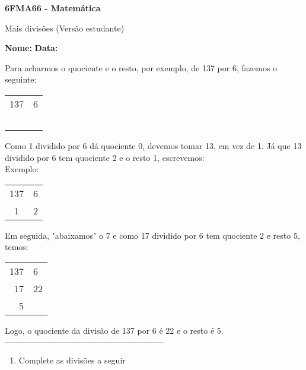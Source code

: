\documentclass[a4paper,14pt]{article}
\begin{document}
	
	\noindent\textbf{6FMA66 - Matemática} 
	
	\begin{center}Mais divisões (Versão estudante)
	\end{center}
	
	\noindent\textbf{Nome:} \underline{\hspace{10cm}}
	\noindent\textbf{Data:} \underline{\hspace{4cm}}
	
	\begin{multicols}{2}
		\noindent Para acharmos o quociente e o resto, por exemplo, de 137 por 6, fazemos o seguinte:
		\begin{table}[H]
			\centering
			\begin{tabular}{ll}
				\multicolumn{1}{l|}{137} & 6 \\ \cline{2-2} 
				~                      & ~
			\end{tabular}
		\end{table}
		Como 1 dividido por 6 dá quociente 0, devemos tomar 13, em vez de 1. Já que 13 dividido por 6 tem quociente 2 e o resto 1, escrevemos: \\
		Exemplo: \begin{table}[H]
			\centering
			\begin{tabular}{ll}
				\multicolumn{1}{l|}{137} & 6 \\ \cline{2-2} 
				~1                      & 2
			\end{tabular}
		\end{table} 
		Em seguida, "abaixamos" o 7 e como 17 dividido por 6 tem quociente 2 e resto 5, temos: \\
		\begin{table}[H]
			\centering
			\begin{tabular}{ll}
				\multicolumn{1}{l|}{137} & 6 \\ \cline{2-2} 
				~17                      & 22 \\
				~~5
			\end{tabular}
		\end{table} 
		Logo, o quociente da divisão de 137 por 6 é 22 e o resto é 5.
    	\textsubscript{---------------------------------------------------------------------}
    	\begin{enumerate}
   			\item Complete as divisões a seguir \\

\end{enumerate}
\end{multicols}
\end{document}
